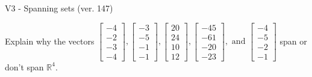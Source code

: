 \begin{exercise}
  \begin{exerciseTitle}V3 - Spanning sets (ver. 147)\end{exerciseTitle}
  \begin{exerciseStatement}
    Explain why the vectors \(\left[\begin{array}{r}
-4 \\
-2 \\
-3 \\
-4
\end{array}\right] , \left[\begin{array}{r}
-3 \\
-5 \\
-1 \\
-1
\end{array}\right] , \left[\begin{array}{r}
20 \\
24 \\
10 \\
12
\end{array}\right] , \left[\begin{array}{r}
-45 \\
-61 \\
-20 \\
-23
\end{array}\right] , \text{ and } \left[\begin{array}{r}
-4 \\
-5 \\
-2 \\
-1
\end{array}\right]\) span or don't span \(\mathbb{R}^4\). 
	



\end{exerciseStatement}
\end{exercise}
